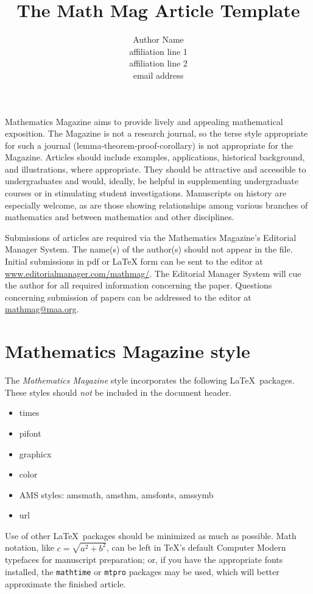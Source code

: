 \documentclass{article}
\theoremstyle{theorem}
\theoremstyle{definition}
\begin{document}
\title{The Math Mag Article Template}

\author{Author Name\\               %
\scriptsize affiliation line 1\\    %
affiliation line 2\\                %
email address}                      %

\maketitle

\noindent  Mathematics Magazine aims to provide lively and appealing mathematical exposition. The Magazine is not a research journal, so the terse style appropriate for such a journal (lemma-theorem-proof-corollary) is not appropriate for the Magazine. Articles should include examples, applications, historical background, and illustrations, where appropriate. They should be attractive and accessible to undergraduates and would, ideally, be helpful in supplementing undergraduate courses or in stimulating student investigations. Manuscripts on history are especially welcome, as are those showing relationships among various branches of mathematics and between mathematics and other disciplines.

Submissions of articles are required via the Mathematics Magazine's Editorial Manager System. The name(s) of the author(s) should not appear in the file. Initial submissions in pdf or LaTeX form can be sent to the editor at \href{http://www.editorialmanager.com/mathmag/}{\url{www.editorialmanager.com/mathmag/}}. 
The Editorial Manager System will cue the author for all required information concerning the paper. Questions concerning submission of papers can be addressed to the editor at \href{mathmag@maa.org}{\url{mathmag@maa.org}}.

\section{Mathematics Magazine style}

The \textit{Mathematics Magazine} style incorporates the following \LaTeX\ packages.  These styles should \textit{not} be included in the document header.
\begin{itemize}
\item times
\item pifont
\item graphicx
\item color
\item AMS styles: amsmath, amsthm, amsfonts, amssymb
\item url
\end{itemize}
Use of other \LaTeX\ packages should be minimized as much as possible. Math notation, like $c = \sqrt{a^2 +b^2}$, can be left in \TeX's default Computer Modern typefaces for manuscript preparation; or, if you have the appropriate fonts installed, the \texttt{mathtime} or \texttt{mtpro} packages may be used, which will better approximate the finished article.
\end{document}
